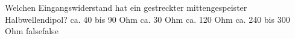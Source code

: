     {Welchen Eingangswiderstand hat ein gestreckter mittengespeister Halbwellendipol?}
    {ca. 40 bis 90 Ohm}
    {ca. 30 Ohm}
    {ca. 120 Ohm}
    {ca. 240 bis 300 Ohm}
    {false}{false}